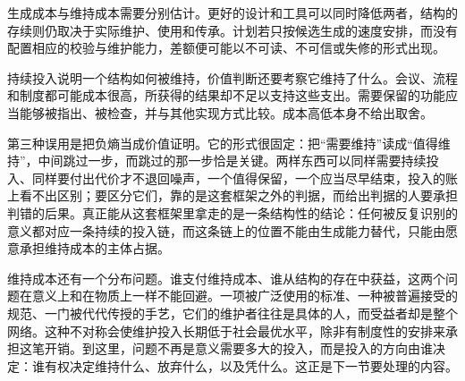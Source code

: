 生成成本与维持成本需要分别估计。更好的设计和工具可以同时降低两者，结构的存续则仍取决于实际维护、使用和传承。计划若只按候选生成的速度安排，而没有配置相应的校验与维护能力，差额便可能以不可读、不可信或失修的形式出现。


持续投入说明一个结构如何被维持，价值判断还要考察它维持了什么。会议、流程和制度都可能成本很高，所获得的结果却不足以支持这些支出。需要保留的功能应当能够被指出、被检查，并与其他实现方式比较。成本高低本身不给出取舍。

第三种误用是把负熵当成价值证明。它的形式很固定：把“需要维持”读成“值得维持”，中间跳过一步，而跳过的那一步恰是关键。两样东西可以同样需要持续投入、同样要付出代价才不退回噪声，一个值得保留，一个应当尽早结束，投入的账上看不出区别；要区分它们，靠的是这套框架之外的判据，而给出判据的人要承担判错的后果。真正能从这套框架里拿走的是一条结构性的结论：任何被反复识别的意义都对应一条持续的投入链，而这条链上的位置不能由生成能力替代，只能由愿意承担维持成本的主体占据。

维持成本还有一个分布问题。谁支付维持成本、谁从结构的存在中获益，这两个问题在意义上和在物质上一样不能回避。一项被广泛使用的标准、一种被普遍接受的规范、一门被代代传授的手艺，它们的维护者往往是具体的人，而受益者却是整个网络。这种不对称会使维护投入长期低于社会最优水平，除非有制度性的安排来承担这笔开销。到这里，问题不再是意义需要多大的投入，而是投入的方向由谁决定：谁有权决定维持什么、放弃什么，以及凭什么。这正是下一节要处理的内容。
